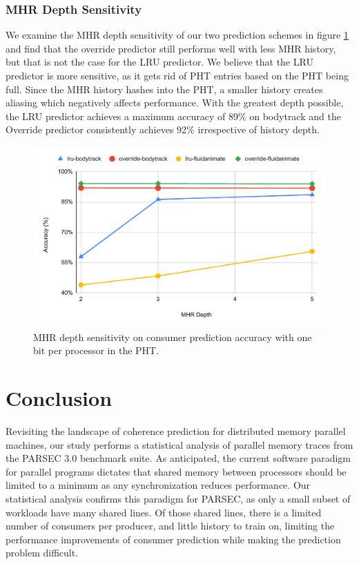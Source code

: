         \subsubsection{MHR Depth Sensitivity}
            We examine the MHR depth sensitivity of our two prediction schemes in figure \ref{fig:depth-sensitivity} and find that the override predictor still performs well with less MHR history, but that is not the case for the LRU predictor. We believe that the LRU predictor is more sensitive, as it gets rid of PHT entries based on the PHT being full. Since the MHR history hashes into the PHT, a smaller history creates aliasing which negatively affects performance. With the greatest depth possible, the LRU predictor achieves a maximum accuracy of 89\% on bodytrack and the Override predictor consistently achieves 92\% irrespective of history depth.
    
            \begin{figure}[h!]
                \centering
                \includegraphics[scale=0.45]{img/history_depth_sensitivity.pdf}
                \caption{MHR depth sensitivity on consumer prediction accuracy with one bit per processor in the PHT.}
                \label{fig:depth-sensitivity}
            \end{figure}


\section{Conclusion}
    Revisiting the landscape of coherence prediction for distributed memory parallel machines, our study performs a statistical analysis of parallel memory traces from the PARSEC 3.0 benchmark suite. As anticipated, the current software paradigm for parallel programs dictates that shared memory between processors should be limited to a minimum as any synchronization reduces performance. Our statistical analysis confirms this paradigm for PARSEC, as only a small subset of workloads have many shared lines. Of those shared lines, there is a limited number of consumers per producer, and little history to train on, limiting the performance improvements of consumer prediction while making the prediction problem difficult. \\

